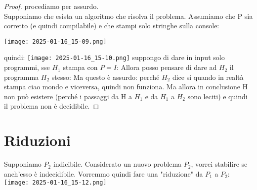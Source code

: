	\begin{proof}
		procediamo per assurdo.\\Supponiamo che esista un algoritmo che risolva il problema.
		Assumiamo che P sia corretto (e quindi compilabile) e che stampi solo stringhe sulla console:
		\begin{center}
		\texttt{[image: 2025-01-16\_15-09.png]}
		\end{center}
		quindi:
		\texttt{[image: 2025-01-16\_15-10.png]}
		suppongo di dare in input solo programmi, sse $H_1$ stampa con $P=I$:
		Allora posso pensare di dare ad $H_2$ il programma $H_2$ stesso:
		Ma questo è assurdo: perché $H_2$ dice si quando in realtà stampa ciao mondo e viceversa, quindi
		non funziona. Ma allora in conclusione H non può esistere (perché i passaggi da H a $H_1$ e da $H_1$ a
		$H_2$ sono leciti) e quindi il problema non è decidibile.
	\end{proof}
	\section{Riduzioni}
	Supponiamo $P_2$ indicibile. Considerato un nuovo problema $P_2$, vorrei stabilire se anch'esso è
	indecidibile. Vorremmo quindi fare una "riduzione" da $P_1$ a $P_2$:
		\texttt{[image: 2025-01-16\_15-12.png]}

